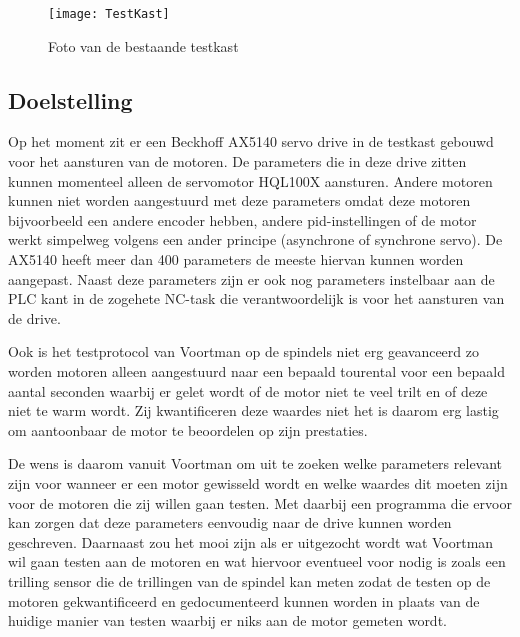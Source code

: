 \begin{figure}[h]
	\centering
	\texttt{[image: TestKast]}
	\label{fig:TestKastFoto}
	\caption{Foto van de bestaande testkast}
\end{figure}

\newpage

\subsection{Doelstelling}

Op het moment zit er een Beckhoff \gls{AX5140} servo drive in de testkast gebouwd voor het aansturen van de motoren. De parameters die in deze drive zitten kunnen momenteel alleen de servomotor HQL100X aansturen. Andere motoren kunnen niet worden aangestuurd met deze parameters omdat deze motoren bijvoorbeeld een andere encoder hebben, andere \gls{pid}-instellingen of de motor werkt simpelweg volgens een ander principe (asynchrone of synchrone servo). De \gls{AX5140} heeft meer dan 400 parameters de meeste hiervan kunnen worden aangepast. Naast deze parameters zijn er ook nog parameters instelbaar aan de PLC kant in de zogehete \gls{NC}-task die verantwoordelijk is voor het aansturen van de drive.

\vspace{0.5cm}

Ook is het testprotocol van Voortman op de spindels niet erg geavanceerd zo worden motoren alleen aangestuurd naar een bepaald tourental voor een bepaald aantal seconden waarbij er gelet wordt of de motor niet te veel trilt en of deze niet te warm wordt. Zij kwantificeren deze waardes niet het is daarom erg lastig om aantoonbaar de motor te beoordelen op zijn prestaties.

\vspace{0.5cm}

De wens is daarom vanuit Voortman om uit te zoeken welke parameters relevant zijn voor wanneer er een motor gewisseld wordt en welke waardes dit moeten zijn voor de motoren die zij willen gaan testen. Met daarbij een programma die ervoor kan zorgen dat deze parameters eenvoudig naar de drive kunnen worden geschreven. Daarnaast zou het mooi zijn als er uitgezocht wordt wat Voortman wil gaan testen aan de motoren en wat hiervoor eventueel voor nodig is zoals een trilling sensor die de trillingen van de spindel kan meten zodat de testen op de motoren gekwantificeerd en gedocumenteerd kunnen worden in plaats van de huidige manier van testen waarbij er niks aan de motor gemeten wordt.

